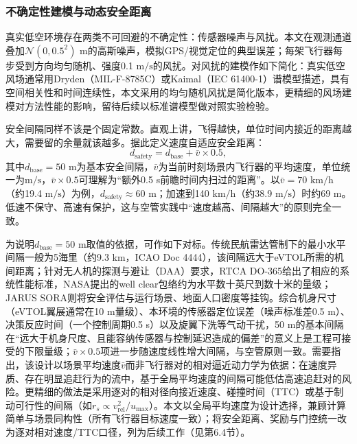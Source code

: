 \documentclass[12pt,a4paper,UTF8]{ctexart}
\begin{document}
\subsubsection{不确定性建模与动态安全距离}

真实低空环境存在两类不可回避的不确定性：传感器噪声与风扰。本文在观测通道叠加$\mathcal{N}(0, 0.5^2)$ m的高斯噪声，模拟GPS/视觉定位的典型误差；每架飞行器每步受到方向均匀随机、强度0.1 $\mathrm{m/s}$的风扰。对风扰的建模作如下简化：真实低空风场通常用Dryden（MIL-F-8785C）\cite{ref26}或Kaimal（IEC 61400-1）\cite{ref44}谱模型描述，具有空间相关性和时间连续性，本文采用的均匀随机风扰是简化版本，更精细的风场建模对方法性能的影响，留待后续以标准谱模型做对照实验检验。

安全间隔同样不该是个固定常数。直观上讲，飞得越快，单位时间内接近的距离越大，需要留的余量就该越多。据此定义速度自适应安全距离：
\begin{equation}
    d_{\text{safety}} = d_{\text{base}} + \bar{v} \times 0.5,
    \label{eq:safety_distance}
\end{equation}
其中$d_{\text{base}}=50$ m为基本安全间隔，$\bar{v}$为当前时刻场景内飞行器的平均速度，单位统一为$\mathrm{m/s}$，$\bar{v}\times0.5$可理解为“额外0.5 s前瞻时间内扫过的距离”。以$\bar{v}=70$ $\mathrm{km/h}$（约19.4 $\mathrm{m/s}$）为例，$d_{\text{safety}}\approx60$ m；加速到140 $\mathrm{km/h}$（约38.9 $\mathrm{m/s}$）时约69 m。低速不保守、高速有保护，这与空管实践中“速度越高、间隔越大”的原则完全一致。

为说明$d_{\text{base}}=50$ m取值的依据，可作如下对标。传统民航雷达管制下的最小水平间隔一般为5海里（约9.3 km，ICAO Doc 4444）\cite{ref49}，该间隔远大于eVTOL所需的机间距离；针对无人机的探测与避让（DAA）要求，RTCA DO-365给出了相应的系统性能标准\cite{ref51}，NASA提出的well clear包络约为水平数十英尺到数十米的量级；JARUS SORA则将安全评估与运行场景、地面人口密度等挂钩\cite{ref50}。综合机身尺寸（eVTOL翼展通常在10 m量级）、本环境的传感器定位误差（噪声标准差0.5 m）、决策反应时间（一个控制周期0.5 s）以及旋翼下洗等气动干扰，50 m的基本间隔在“远大于机身尺度、且能容纳传感器与控制延迟造成的偏差”的意义上是工程可接受的下限量级；$\bar{v}\times0.5$项进一步随速度线性增大间隔，与空管原则一致。需要指出，该设计以场景平均速度$\bar{v}$而非飞行器对的相对逼近动力学为依据：在速度异质、存在明显追赶行为的流中，基于全局平均速度的间隔可能低估高速追赶对的风险。更精细的做法是采用逐对的相对径向接近速度、碰撞时间（TTC）或基于制动可行性的间隔（如$r_s\propto v_{\text{rel}}^2/u_{\max}$）。本文以全局平均速度为设计选择，兼顾计算简单与场景同构性（所有飞行器目标速度一致）；将安全距离、奖励与门控统一改为逐对相对速度/TTC口径，列为后续工作（见第6.4节）。
\end{document}
